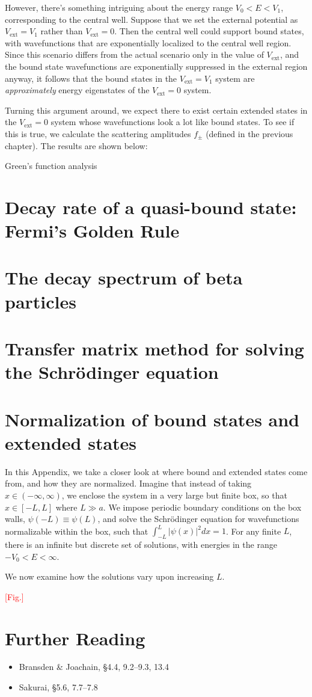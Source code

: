 \documentclass[pra,11pt]{revtex4}
\begin{document}
However, there's something intriguing about the energy range $V_0 < E
< V_1$, corresponding to the central well.  Suppose that we set the
external potential as $V_{\mathrm{ext}} = V_1$ rather than
$V_{\mathrm{ext}} = 0$.  Then the central well could support bound
states, with wavefunctions that are exponentially localized to the
central well region.  Since this scenario differs from the actual
scenario only in the value of $V_{\mathrm{ext}}$, and the bound state
wavefunctions are exponentially suppressed in the external region
anyway, it follows that the bound states in the $V_{\mathrm{ext}} =
V_1$ system are \textit{approximately} energy eigenstates of the
$V_{\mathrm{ext}} = 0$ system.

Turning this argument around, we expect there to exist certain
extended states in the $V_{\mathrm{ext}} = 0$ system whose
wavefunctions look a lot like bound states.  To see if this is true,
we calculate the scattering amplitudes $f_\pm$ (defined in the
previous chapter).  The results are shown below:



Green's function analysis

\section{Decay rate of a quasi-bound state: Fermi's Golden Rule}

\section{The decay spectrum of beta particles}


\appendix
\section{Transfer matrix method for solving the Schr\"odinger equation}


\section{Normalization of bound states and extended states}

In this Appendix, we take a closer look at where bound and extended
states come from, and how they are normalized.  Imagine that instead
of taking $x \in (-\infty,\infty)$, we enclose the system in a very
large but finite box, so that $x \in [-L,L]$ where $L \gg a$.  We
impose periodic boundary conditions on the box walls, $\psi(-L) \equiv
\psi(L)$, and solve the Schr\"odinger equation for wavefunctions
normalizable within the box, such that $\int_{-L}^{L} |\psi(x)|^2 dx =
1$.  For any finite $L$, there is an infinite but discrete set of
solutions, with energies in the range $-V_0 <E < \infty$.

We now examine how the solutions vary upon increasing $L$.

\textcolor{red}{[Fig.]}





\section{Further Reading}

\begin{itemize}
\item Bransden \& Joachain, \S4.4, 9.2--9.3, 13.4
\item Sakurai, \S5.6, 7.7--7.8

\end{itemize}
\end{document}
